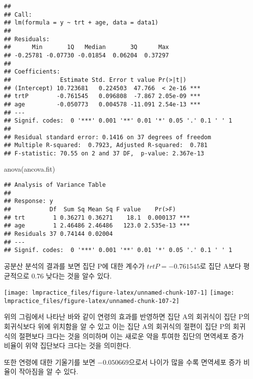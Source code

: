 \documentclass[
]{book}
\newenvironment{Shaded}{\begin{snugshade}}{\end{snugshade}}
\newcommand{\FunctionTok}[1]{\textcolor[rgb]{0.00,0.00,0.00}{#1}}
\newcommand{\NormalTok}[1]{#1}
\begin{document}
\begin{verbatim}
## 
## Call:
## lm(formula = y ~ trt + age, data = data1)
## 
## Residuals:
##      Min       1Q   Median       3Q      Max 
## -0.25781 -0.07730 -0.01854  0.06204  0.37297 
## 
## Coefficients:
##              Estimate Std. Error t value Pr(>|t|)    
## (Intercept) 10.723681   0.224503  47.766  < 2e-16 ***
## trtP        -0.761545   0.096808  -7.867 2.05e-09 ***
## age         -0.050773   0.004578 -11.091 2.54e-13 ***
## ---
## Signif. codes:  0 '***' 0.001 '**' 0.01 '*' 0.05 '.' 0.1 ' ' 1
## 
## Residual standard error: 0.1416 on 37 degrees of freedom
## Multiple R-squared:  0.7923, Adjusted R-squared:  0.781 
## F-statistic: 70.55 on 2 and 37 DF,  p-value: 2.367e-13
\end{verbatim}

\begin{Shaded}
\begin{Highlighting}[]
\FunctionTok{anova}\NormalTok{(ancova.fit)}
\end{Highlighting}
\end{Shaded}

\begin{verbatim}
## Analysis of Variance Table
## 
## Response: y
##           Df  Sum Sq Mean Sq F value    Pr(>F)    
## trt        1 0.36271 0.36271    18.1  0.000137 ***
## age        1 2.46486 2.46486   123.0 2.535e-13 ***
## Residuals 37 0.74144 0.02004                      
## ---
## Signif. codes:  0 '***' 0.001 '**' 0.01 '*' 0.05 '.' 0.1 ' ' 1
\end{verbatim}

공분산 분석의 결과를 보면 집단 P에 대한 계수가 \(trtP= -0.761545\)로 집단 A보다 평균적으로 \(0.76\) 낮다는 것을 알수 있다.

\begin{center}\texttt{[image: lmpractice\_files/figure-latex/unnamed-chunk-107-1]} \texttt{[image: lmpractice\_files/figure-latex/unnamed-chunk-107-2]} \end{center}

위의 그림에서 나타난 바와 같이 연령의 효과를 반영하면 집단 A의 회귀식이 집단 P의
회귀식보다 위에 위치함을 알 수 있고 이는 집단 A의 회귀식의 절편이 집단 P의 회귀식의 절편보다 크다는 것을 의미하며 이는 새로운 약을 투여한 집단의 면역세포 증가 비율이 위약 집단보다 크다는 것을 의미한다.

또한 연령에 대한 기울기를 보면 \(-0.050669\)으로서
나이가 많을 수록 면역세포 증가 비율이 작아짐을 알 수 있다.
\end{document}

